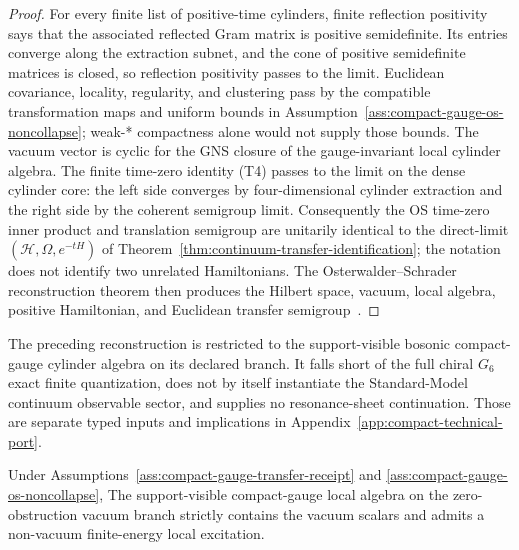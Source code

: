 \begin{proof}
For every finite list of positive-time cylinders, finite reflection positivity says that the
associated reflected Gram matrix is positive semidefinite. Its entries converge along the
extraction subnet, and the cone of positive semidefinite matrices is closed, so reflection
positivity passes to the limit. Euclidean covariance, locality, regularity, and clustering pass by
the compatible transformation maps and uniform bounds in
Assumption~\ref{ass:compact-gauge-os-noncollapse}; weak-* compactness alone would not supply those
bounds. The vacuum vector is cyclic for the GNS closure of the gauge-invariant local cylinder
algebra. The finite time-zero identity (T4) passes to the limit on the dense cylinder core:
the left side converges by four-dimensional cylinder extraction and the right side by the coherent
semigroup limit. Consequently the OS time-zero inner product and translation semigroup are
unitarily identical to the direct-limit \((\mathcal H,\Omega,e^{-tH})\) of
Theorem~\ref{thm:continuum-transfer-identification}; the notation does not identify two unrelated
Hamiltonians. The
Osterwalder--Schrader reconstruction theorem then produces the Hilbert space, vacuum, local
algebra, positive Hamiltonian, and Euclidean transfer semigroup~\cite{osterwalderSchrader73,
osterwalderSchrader75}.
\end{proof}

\begin{remark}
The preceding reconstruction is restricted to the support-visible bosonic
compact-gauge cylinder algebra on its declared branch. It falls short of the full
chiral \(G_6\) exact finite quantization, does not by itself instantiate the
Standard-Model continuum observable sector, and supplies no resonance-sheet
continuation. Those are separate typed inputs and implications in
Appendix~\ref{app:compact-technical-port}.
\end{remark}

\begin{proposition}
\label{prop:compact-gauge-nontriviality-yang-mills}
Under Assumptions~\ref{ass:compact-gauge-transfer-receipt} and
\ref{ass:compact-gauge-os-noncollapse},
The support-visible compact-gauge local algebra on the zero-obstruction vacuum branch strictly
contains the vacuum scalars and admits a non-vacuum finite-energy local excitation.
\end{proposition}

